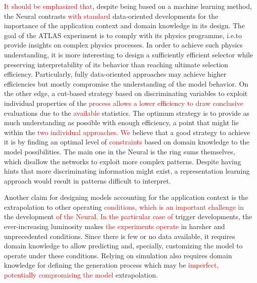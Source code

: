\textcolor{red}{It should be emphasized that}, 
despite being based on a machine learning method, the Neural\rnn{}
contrasts \textcolor{red}{with standard} data-oriented developments for the importance of the
application context and domain knowledge in its design. The goal of the ATLAS
experiment is to comply with its physics programme, i.e.\@ to provide insights on
complex physics processes. In order to achieve such physics understanding, it is
more interesting to design a sufficiently efficient selector while preserving
interpretability of its behavior than reaching ultimate selection efficiency.
Particularly, fully data-oriented approaches may achieve higher efficiencies but
mostly compromise the understanding of the model behavior. On the other edge,
a cut-based strategy based on discriminating variables to exploit individual
properties of the \textcolor{red}{process allows a lower efficiency to draw conclusive} evaluations due to the \textcolor{red}{available} statistics. The optimum strategy is to provide as
much understanding as possible with enough efficiency, a point that might lie
within the \textcolor{red}{two individual approaches. We} believe that a good strategy to achieve it is by
finding an optimal level of \textcolor{red}{constraints} based on domain knowledge to the model
possibilities. The main one in the Neural\rnn{} is the ring sums themselves, which
disallow the networks to exploit more complex patterns. Despite having hints
that more discriminating information might exist, a representation learning
approach would result in patterns difficult to interpret.

Another claim for designing models accounting for the application context
is the extrapolation to other operating \textcolor{red}{conditions, which is an important challenge in} 
the development \textcolor{red}{ of the Neural\rnn. In the particular case of }
trigger developments, the ever-increasing luminosity makes \textcolor{red}{the experiments operate} in harsher and
unprecedented conditions. Since there is few or no data available, it requires
domain knowledge to allow predicting and, specially, customizing the model to
operate under these conditions. Relying on simulation also requires domain
knowledge for defining the generation process which may be \textcolor{red}{imperfect, potentially compromising the model} extrapolation.

